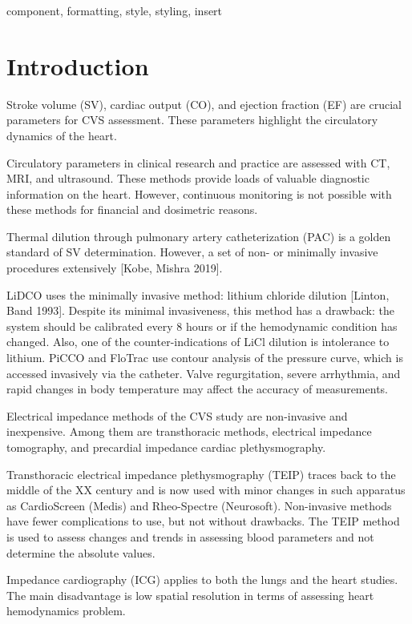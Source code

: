 \documentclass[conference]{IEEEtran}
\begin{document}
\begin{IEEEkeywords}
component, formatting, style, styling, insert
\end{IEEEkeywords}

\section{Introduction}

Stroke volume (SV), cardiac output (CO), and ejection fraction (EF) are crucial
parameters for CVS assessment. These parameters highlight the circulatory
dynamics of the heart.

Circulatory parameters in clinical research and practice are assessed with CT,
MRI, and ultrasound. These methods provide loads of valuable diagnostic
information on the heart. However, continuous monitoring is not possible with
these methods for financial and dosimetric reasons. 

Thermal dilution through pulmonary artery catheterization (PAC) is a golden
standard of SV determination. However, a set of non- or minimally invasive
procedures extensively [Kobe, Mishra 2019].

LiDCO uses the minimally invasive method: lithium chloride dilution [Linton,
Band 1993]. Despite its minimal invasiveness, this method has a drawback: the
system should be calibrated every 8 hours or if the hemodynamic condition has
changed. Also, one of the counter-indications of LiCl dilution is intolerance to
lithium. PiCCO and FloTrac use contour analysis of the pressure curve, which is
accessed invasively via the catheter. Valve regurgitation, severe arrhythmia,
and rapid changes in body temperature may affect the accuracy of measurements.

Electrical impedance methods of the CVS study are non-invasive and inexpensive.
Among them are transthoracic methods, electrical impedance tomography, and
precardial impedance cardiac plethysmography. 

Transthoracic electrical impedance plethysmography (TEIP) traces back to the
middle of the XX century and is now used with minor changes in such apparatus as
CardioScreen (Medis) and Rheo-Spectre (Neurosoft). Non-invasive methods have
fewer complications to use, but not without drawbacks. The TEIP method is used
to assess changes and trends in assessing blood parameters and not determine the
absolute values. 

Impedance cardiography (ICG) applies to both the lungs and the heart studies.
The main disadvantage is low spatial resolution in terms of assessing heart
hemodynamics problem. 
\end{document}
